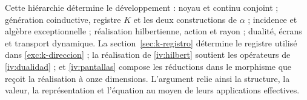 Cette hiérarchie détermine le développement : noyau et continu conjoint ;
génération coinductive, registre \(K\) et les deux constructions de
\(\alpha\) ; incidence et algèbre exceptionnelle ; réalisation hilbertienne,
action et rayon ; dualité, écrans et transport dynamique.
La section~\ref{sec:k-registro} détermine le registre utilisé dans
\ref{exc:k-direccion} ; la réalisation de \ref{iv:hilbert} soutient
les opérateurs de \ref{iv:dualidad} ; et
\ref{iv:pantallas} compose les réductions dans le morphisme que reçoit la
réalisation à onze dimensions. L’argument relie ainsi la structure,
la valeur, la représentation et l’équation au moyen de leurs applications effectives.

\par\endgroup
